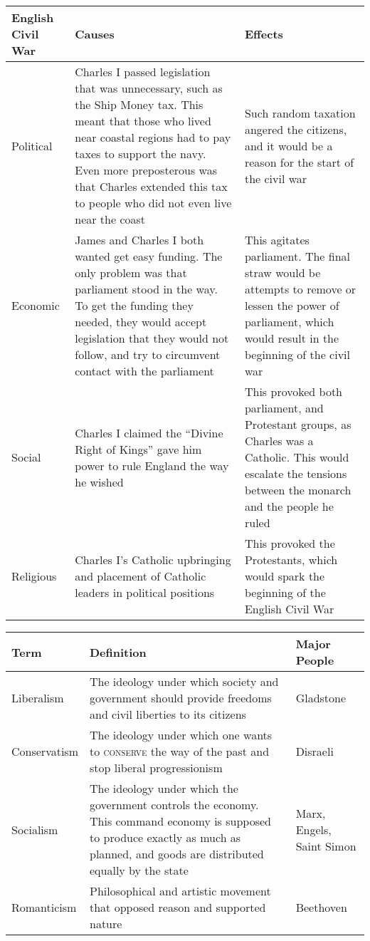\documentclass[12pt]{article}
\begin{document}
\begin{enumerate}
\begin{tabular}{|p{}|p{}|p{}|}
\hline
English Civil War & Causes & Effects \\
\hline
Political & Charles I passed legislation that was unnecessary, such as the Ship Money tax. This meant that those who lived near coastal regions had to pay taxes to support the navy. Even more preposterous was that Charles extended this tax to people who did not even live near the coast & Such random taxation angered the citizens, and it would be a reason for the start of the civil war  \\
\hline
Economic & James and Charles I both wanted get easy funding. The only problem was that parliament stood in the way. To get the funding they needed, they would accept legislation that they would not follow, and try to circumvent contact with the parliament & This agitates parliament. The final straw would be attempts to remove or lessen the power of parliament, which would result in the beginning of the civil war  \\
\hline
Social & Charles I claimed the ``Divine Right of Kings'' gave him power to rule England the way he wished  & This provoked both parliament, and Protestant groups, as Charles was a Catholic. This would escalate the tensions between the monarch and the people he ruled  \\
\hline
Religious & Charles I's Catholic upbringing and placement of Catholic leaders in political positions & This provoked the Protestants, which would spark the beginning of the English Civil War \\
\hline

\end{tabular}

\hspace{-25pt} \begin{tabular}{|p{}|p{}|p{}|}

\hline
Term & Definition & Major People \\
\hline
Liberalism & The ideology under which society and government should provide freedoms and civil liberties to its citizens & Gladstone \\
\hline
Conservatism & The ideology under which one wants to \textsc{conserve} the way of the past and stop liberal progressionism & Disraeli \\
\hline
Socialism & The ideology under which the government controls the economy. This command economy is supposed to produce exactly as much as planned, and goods are distributed equally by the state  & Marx, Engels, Saint Simon \\
\hline
Romanticism & Philosophical and artistic movement that opposed reason and supported nature & Beethoven \\
\hline
\end{tabular}
 

\end{enumerate}
\end{document}
